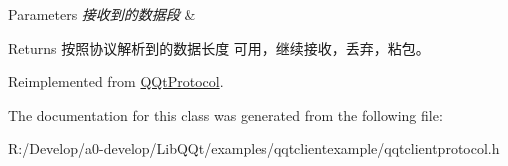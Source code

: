 \begin{DoxyParams}{Parameters}
{\em 接收到的数据段} & \\
\hline
\end{DoxyParams}
\begin{DoxyReturn}{Returns}
按照协议解析到的数据长度 可用，继续接收，丢弃，粘包。 
\end{DoxyReturn}


Reimplemented from \mbox{\hyperlink{class_q_qt_protocol_a00fd0c1ac23379ed3b9b25da9a34f39b}{Q\+Qt\+Protocol}}.



The documentation for this class was generated from the following file\+:\begin{DoxyCompactItemize}
\item 
R\+:/\+Develop/a0-\/develop/\+Lib\+Q\+Qt/examples/qqtclientexample/qqtclientprotocol.\+h\end{DoxyCompactItemize}
